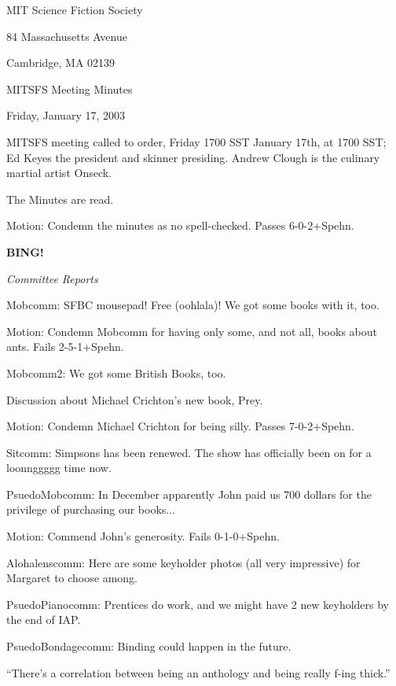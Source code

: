 \documentclass[12pt]{article}
\newcommand{\bing}{{\bf BING!} }
\newcommand{\goto}[1]{\bing \vskip 12pt \centerline{{\em{#1}}}}
\begin{document}
\begin{center}

MIT Science Fiction Society 

84 Massachusetts Avenue

Cambridge, MA 02139

\vspace{12pt}

MITSFS Meeting Minutes 

Friday, January 17, 2003

\end{center}
 
\vspace{18pt}

\setlength{\parskip}{6pt}

\noindent
MITSFS meeting called to order, Friday 1700 SST January 17th, at 1700 SST; Ed Keyes the president and skinner presiding.  Andrew Clough is the culinary martial artist Onseck.

The Minutes are read.

Motion:  Condemn the minutes as no spell-checked.  Passes 6-0-2+Spehn.

\goto{Committee Reports}

Mobcomm:  SFBC mousepad!  Free (oohlala)!  We got some books with it, too.

Motion:  Condemn Mobcomm for having only some, and not all, books about ants.  Fails 2-5-1+Spehn.

Mobcomm2:  We got some British Books, too.

Discussion about Michael Crichton's new book, Prey.

Motion:  Condemn Michael Crichton for being silly.  Passes 7-0-2+Spehn.

Sitcomm:  Simpsons has been renewed.  The show has officially been on for a loonnggggg time now.

PsuedoMobcomm:  In December apparently John paid us 700 dollars for the privilege of purchasing our books...

Motion:  Commend John's generosity.  Fails 0-1-0+Spehn.

Alohalenscomm:  Here are some keyholder photos (all very impressive) for Margaret to choose among.  

PsuedoPianocomm:  Prentices do work, and we might have 2 new keyholders by the end of IAP.

PsuedoBondagecomm:  Binding could happen in the future.

``There's a correlation between being an anthology and being really f-ing thick.''
\end{document}
